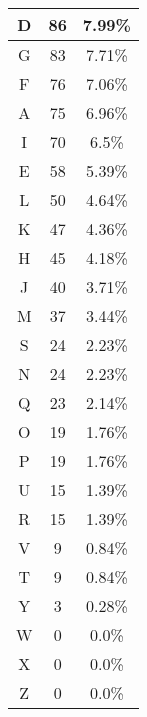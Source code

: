 \documentclass[12pt]{article}
\newenvironment{answer}
{ \begin{tcolorbox}[halign=left]
    }
    {  
  \end{tcolorbox}
}
\begin{document}
\begin{enumerate}
\begin{enumerate}
\begin{answer}
\begin{center}
\begin{tabular}{c|c|c}
        \hline
        D & 86 & 7.99\% \\
        \hline
        G & 83 & 7.71\% \\
        \hline
        F & 76 & 7.06\% \\
        \hline
        A & 75 & 6.96\% \\
        \hline
        I & 70 & 6.5\% \\
        \hline
        E & 58 & 5.39\% \\
        \hline
        L & 50 & 4.64\% \\
        \hline
        K & 47 & 4.36\% \\
        \hline
        H & 45 & 4.18\% \\
        \hline
        J & 40 & 3.71\% \\
        \hline
        M & 37 & 3.44\% \\
        \hline
        S & 24 & 2.23\% \\
        \hline
        N & 24 & 2.23\% \\
        \hline
        Q & 23 & 2.14\% \\
        \hline
        O & 19 & 1.76\% \\
        \hline
        P & 19 & 1.76\% \\
        \hline
        U & 15 & 1.39\% \\
        \hline
        R & 15 & 1.39\% \\
        \hline
        V & 9 & 0.84\% \\
        \hline
        T & 9 & 0.84\% \\
        \hline
        Y & 3 & 0.28\% \\
        \hline
        W & 0 & 0.0\% \\
        \hline
        X & 0 & 0.0\% \\
        \hline
        Z & 0 & 0.0\% \\
      \end{tabular}
    \end{center}
  \end{answer}
    \newpage
    

\end{enumerate}
\end{enumerate}
\end{document}
